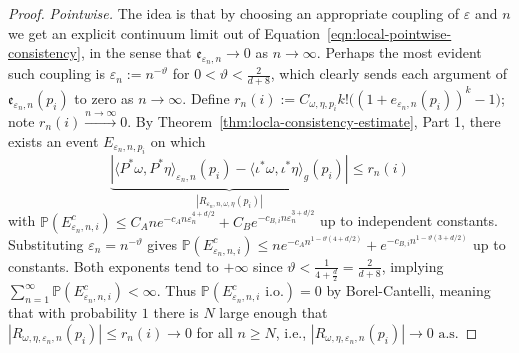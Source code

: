 \documentclass{article}
\theoremstyle{remark}
\theoremstyle{plain}
\begin{document}
\begin{proof}
\textit{Pointwise.} The idea is that by choosing an appropriate coupling of $\varepsilon$ and $n$ we get an explicit continuum limit out of Equation~\ref{eqn:local-pointwise-consistency}, in the sense that $\mathfrak{e}_{\varepsilon_{n}, n} \to 0$ as $n \to \infty$. Perhaps the most evident such coupling is $\varepsilon_{n}:=n^{-\vartheta}$ for $0<\vartheta< \frac{2}{d+8}$, which clearly sends each argument of $\mathfrak{e}_{\varepsilon_{n}, n}(p_i)$ to zero as $n\to \infty$. Define $r_{n}(i):=C_{\omega, \eta, p_{i}}k!\big( (1 + e_{\varepsilon_{n}, n}(p_{i}))^{k}-1 \big)$; note $r_{n}(i) \xrightarrow{n \to \infty}0$. By Theorem~\ref{thm:locla-consistency-estimate}, Part 1, there exists an event $E_{\varepsilon_{n},n,p_{i}}$ on which $$\underbrace{ |\langle P^{*}\omega, P^{*}\eta \rangle_{\varepsilon_{n},n}(p_{i}) -\langle \iota^{*}\omega, \iota^{*}\eta \rangle_{g}(p_{i}) | }_{ |R_{\varepsilon_{n}, n, \omega, \eta}(p_{i})| }\leq r_{n}(i)$$
with $\mathbb{P}(E_{\varepsilon_{n}, n, {i}}^{c})\leq C_{A}n e^{-c_{A}n \varepsilon_{n}^{4+d/2}}+C_{B}e^{-c_{B,i}n \varepsilon_{n}^{3+d/2}}$ up to independent constants. Substituting  $\varepsilon_{n}=n^{- \vartheta}$ gives $\mathbb{P}(E_{\varepsilon_{n}, n, i}^{c}) \leq ne^{-c_{A}n^{1-\vartheta(4+d/2)}}+e^{-c_{B, i}n^{1 - \vartheta(3+d/2)}}$ up to constants. Both exponents tend to $+\infty$ since $\vartheta< \frac{1}{4+\frac{d}{2}}=\frac{2}{d+8}$, implying $\sum_{n=1}^{\infty}\mathbb{P}(E_{\varepsilon_{n},n,i}^{c})<\infty$. Thus $\mathbb{P}(E_{\varepsilon_{n}, n, i}^{c} \text{ i.o.})=0$ by Borel-Cantelli, meaning that with probability $1$ there is $N$ large enough that $|R_{\omega, \eta, \varepsilon_{n}, n}(p_{i})| \leq r_{n}(i) \to 0$ for all $n \geq N$, i.e., $|R_{\omega, \eta, \varepsilon_{n}, n}(p_{i})| \to 0 \text{ a.s.}$


\end{proof}
\end{document}
